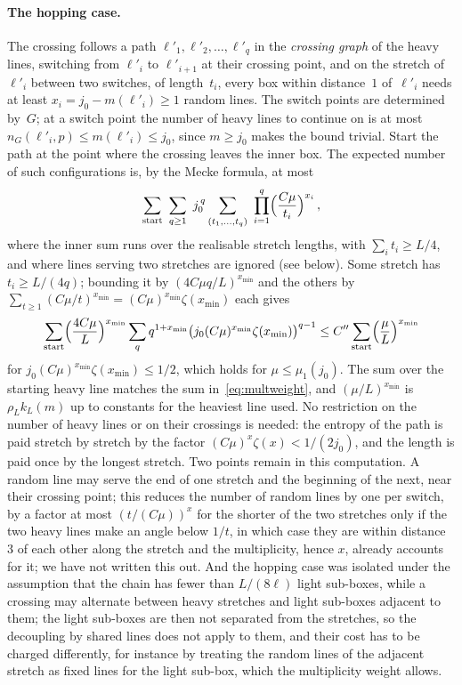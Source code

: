 \documentclass[11pt,letterpaper]{article}
\begin{document}
\paragraph{The hopping case.} The crossing follows a path $\ell'_1,\ell'_2,\dots,\ell'_q$ in the \emph{crossing graph} of the heavy lines, switching from $\ell'_i$ to $\ell'_{i+1}$ at their crossing point, and on the stretch of~$\ell'_i$ between two switches, of length~$t_i$, every box within distance~$1$ of~$\ell'_i$ needs at least $x_i=j_0-m(\ell'_i)\ge1$ random lines. The switch points are determined by~$G$; at a switch point the number of heavy lines to continue on is at most $n_G(\ell'_i,p)\le m(\ell'_i)\le j_0$, since $m\ge j_0$ makes the bound trivial. Start the path at the point where the crossing leaves the inner box. The expected number of such configurations is, by the Mecke formula, at most
\begin{equation*}
  \sum_{\text{start}}\ \sum_{q\ge1}\ j_0^{\,q}\sum_{(t_1,\dots,t_q)}\ \prod_{i=1}^q\Bigl(\frac{C\mu}{t_i}\Bigr)^{x_i}\,,
\end{equation*}
where the inner sum runs over the realisable stretch lengths, with $\sum_it_i\ge L/4$, and where lines serving two stretches are ignored (see below). Some stretch has $t_i\ge L/(4q)$; bounding it by $(4C\mu q/L)^{x_{\min}}$ and the others by $\sum_{t\ge1}(C\mu/t)^{x_{\min}}=(C\mu)^{x_{\min}}\zeta(x_{\min})$ each gives
\begin{equation*}
  \sum_{\text{start}}\Bigl(\frac{4C\mu}{L}\Bigr)^{x_{\min}}\sum_qq^{1+x_{\min}}\bigl(j_0(C\mu)^{x_{\min}}\zeta(x_{\min})\bigr)^{q-1}\le C''\sum_{\text{start}}\Bigl(\frac{\mu}{L}\Bigr)^{x_{\min}}
\end{equation*}
for $j_0(C\mu)^{x_{\min}}\zeta(x_{\min})\le1/2$, which holds for $\mu\le\mu_1(j_0)$. The sum over the starting heavy line matches the sum in~\eqref{eq:multweight}, and $(\mu/L)^{x_{\min}}$ is $\rho_Lk_L(m)$ up to constants for the heaviest line used. No restriction on the number of heavy lines or on their crossings is needed: the entropy of the path is paid stretch by stretch by the factor $(C\mu)^{x}\zeta(x)<1/(2j_0)$, and the length is paid once by the longest stretch. Two points remain in this computation. A random line may serve the end of one stretch and the beginning of the next, near their crossing point; this reduces the number of random lines by one per switch, by a factor at most $(t/(C\mu))^{x}$ for the shorter of the two stretches only if the two heavy lines make an angle below $1/t$, in which case they are within distance~$3$ of each other along the stretch and the multiplicity, hence $x$, already accounts for it; we have not written this out. And the hopping case was isolated under the assumption that the chain has fewer than $L/(8\ell)$ light sub-boxes, while a crossing may alternate between heavy stretches and light sub-boxes adjacent to them; the light sub-boxes are then not separated from the stretches, so the decoupling by shared lines does not apply to them, and their cost has to be charged differently, for instance by treating the random lines of the adjacent stretch as fixed lines for the light sub-box, which the multiplicity weight allows.
\end{document}
